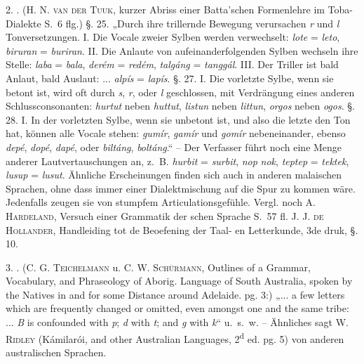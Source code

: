 {2. . (\textsc{H. N. van der Tuuk}, kurzer Abriss einer Batta’schen Formenlehre im Toba-Dialekte S.~6 flg.) §. 25. „Durch ihre trillernde Bewegung verursachen \textit{r} und \textit{l} Tonversetzungen. I. Die Vocale zweier Sylben werden verwechselt: \textit{lote} = \textit{leto}, \textit{biruran} = \textit{buriran}. II. Die Anlaute von aufeinanderfolgenden Sylben wechseln ihre Stelle: \textit{laba} = \textit{bala}, \textit{derém} = \textit{redém}, \textit{talgáng} = \textit{tanggál}. III. Der Triller ist bald Anlaut, bald Auslaut: ... \textit{alpís} = \textit{lapís}. §. 27. I.  Die vorletzte Sylbe, wenn sie betont ist, wird oft durch \textit{s}, \textit{r}, oder \textit{l} geschlossen, mit Verdrängung eines anderen Schlussconsonanten: \textit{hurtut} neben \textit{huttut}, \textit{listun} neben \textit{littun}, \textit{orgos} neben \textit{ogos}. §. 28. I. In der vorletzten Sylbe, wenn sie unbetont ist, und also die letzte den Ton hat, können alle Vocale stehen: \textit{gumír}, \textit{gamír} und \textit{gomír} nebeneinander, ebenso \textit{depé}, \textit{dopé}, \textit{dapé}, oder \textit{biltáng}, \textit{boltáng}.“ – Der Verfasser führt noch eine Menge anderer Lautvertauschungen an, z.~B. \textit{hurbit} = \textit{surbit}, \textit{nop}  \textit{nok}, \textit{teptep} = \textit{tektek}, \textit{lusup} = \textit{lusut}. Ähnliche Erscheinungen finden sich auch in anderen malaischen Sprachen, ohne dass immer einer Dialektmischung auf die Spur zu kommen wäre. Jedenfalls zeugen sie von stumpfem Articulationsgefühle. Vergl. noch \textsc{A. Hardeland}, Versuch einer Grammatik der \label{sp.194} schen Sprache S.~57 fl. \textsc{J. J. de Hollander}, Handleiding tot de Beoefening der  Taal- en Letterkunde, 3de druk, §. 10.

3. . (\textsc{C. G. Teichelmann} u. \textsc{C. W. Schürmann}, \foreignlanguage{english}{Outlines of a Grammar, Vocabulary, and Phraseology of  Aborig. Language of South Australia, spoken by the Natives in and for some Distance around Adelaide. pg. 3:) „... a few letters which are frequently changed or omitted, even amongst one and the same tribe: ... \textit{B} is confounded with \textit{p}; \textit{d} with \textit{t}; and \textit{g} with \textit{k}}“ u.~s.~w. – Ähnliches sagt \textsc{W. Ridley} (\foreignlanguage{english}{Kámilarói, and other Australian Languages}, 2\textsuperscript{d} ed. pg. 5) von anderen australischen Sprachen.

}
